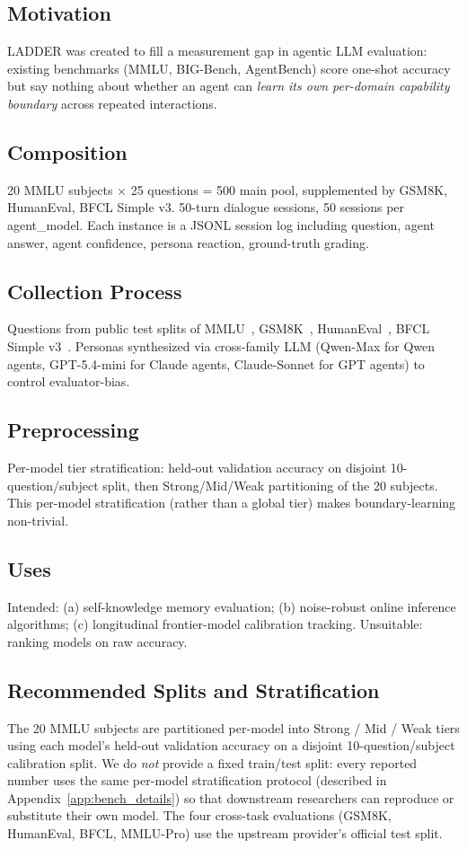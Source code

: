 \documentclass[11pt]{article}
\begin{document}
\subsection*{Motivation}
LADDER was created to fill a measurement gap in agentic LLM evaluation: existing benchmarks (MMLU, BIG-Bench, AgentBench) score one-shot accuracy but say nothing about whether an agent can \emph{learn its own per-domain capability boundary} across repeated interactions.

\subsection*{Composition}
20 MMLU subjects $\times$ 25 questions = 500 main pool, supplemented by GSM8K, HumanEval, BFCL Simple v3. 50-turn dialogue sessions, 50 sessions per agent\_model. Each instance is a JSONL session log including question, agent answer, agent confidence, persona reaction, ground-truth grading.

\subsection*{Collection Process}
Questions from public test splits of MMLU~\citep{hendrycks2021measuring}, GSM8K~\citep{cobbe2021gsm8k}, HumanEval~\citep{chen2021humaneval}, BFCL Simple v3~\citep{bfcl2024}. Personas synthesized via cross-family LLM (Qwen-Max for Qwen agents, GPT-5.4-mini for Claude agents, Claude-Sonnet for GPT agents) to control evaluator-bias.

\subsection*{Preprocessing}
Per-model tier stratification: held-out validation accuracy on disjoint 10-question/subject split, then Strong/Mid/Weak partitioning of the 20 subjects. This per-model stratification (rather than a global tier) makes boundary-learning non-trivial.

\subsection*{Uses}
Intended: (a) self-knowledge memory evaluation; (b) noise-robust online inference algorithms; (c) longitudinal frontier-model calibration tracking. Unsuitable: ranking models on raw accuracy.

\subsection*{Recommended Splits and Stratification}
The 20 MMLU subjects are partitioned per-model into Strong / Mid / Weak tiers using each model's held-out validation accuracy on a disjoint 10-question/subject calibration split. We do \emph{not} provide a fixed train/test split: every reported number uses the same per-model stratification protocol (described in Appendix~\ref{app:bench_details}) so that downstream researchers can reproduce or substitute their own model. The four cross-task evaluations (GSM8K, HumanEval, BFCL, MMLU-Pro) use the upstream provider's official test split.
\end{document}
